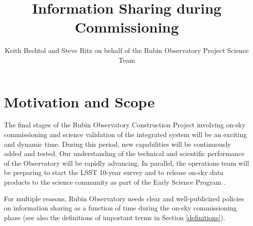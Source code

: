 \documentclass[SE,authoryear,toc]{lsstdoc}
\title{Information Sharing during Commissioning}
\author{
Keith Bechtol and Steve Ritz on behalf of the Rubin Observatory Project Science Team
}
\date{\vcsDate}
\begin{document}
\maketitle


\section{Motivation and Scope}

The final stages of the Rubin Observatory Construction Project involving on-sky commissioning and science validation of the integrated system will be an exciting and dynamic time.
During this period, new capabilities will be continuously added and tested.
Our understanding of the technical and scientific performance of the Observatory will be rapidly advancing.
In parallel, the operations team will be preparing to start the LSST 10-year survey and to release on-sky data products to the science community as part of the Early Science Program .

For multiple reasons, Rubin Observatory needs clear and well-publicized policies on information sharing as a function of time during the on-sky commissioning phase (see also the definitions of important terms in Section \ref{definitions}).
\end{document}
